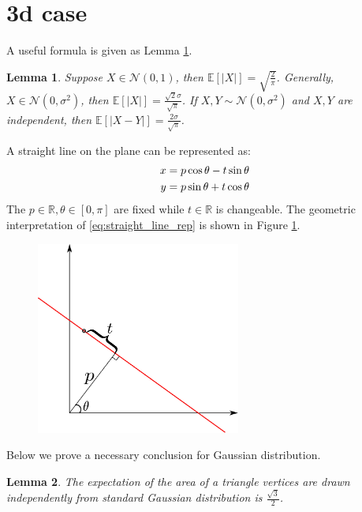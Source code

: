 \documentclass{article}
\newtheorem{lemma}{Lemma}
\def\E{\mathbb{E}}
\def\R{\mathbb{R}}
\begin{document}
\section{3d case}
A useful formula is given as Lemma \ref{lem:abs_gaussian}.
\begin{lemma}\label{lem:abs_gaussian}
Suppose $X \in \mathcal{N}(0,1)$,
then $\E[|X|]=\sqrt{\frac{2}{\pi}}$.
Generally, $X \in \mathcal{N}(0,\sigma^2)$,
then $\E[|X|]=\frac{\sqrt{2}\sigma}{\sqrt{\pi}}$.
If $X,Y\sim \mathcal{N}(0,\sigma^2)$ and $X,Y$ are independent,
then $\E[|X-Y|]=\frac{2\sigma}{\sqrt{\pi}}$.
\end{lemma}
A straight line on the plane
can be represented as:
\begin{align}
    x & = p \cos \theta - t \sin \theta \notag \\
    y & = p \sin \theta + t \cos \theta \label{eq:straight_line_rep}
\end{align}
The $p \in \R, \theta \in [0, \pi]$ are fixed while
$t \in \R$ is changeable.
The geometric interpretation of \eqref{eq:straight_line_rep}
is shown in Figure \ref{fig:transformation}.
\begin{figure}[!ht]
    \centering
    \includegraphics[width=0.6\textwidth]{transformation.pdf}
    \caption{}\label{fig:transformation}
\end{figure}
Below we prove a necessary conclusion for Gaussian distribution.
\begin{lemma}
    The expectation of the area of a triangle
    vertices are drawn independently
    from standard Gaussian distribution is $\frac{\sqrt{3}}{2}$.
\end{lemma}
\end{document}
